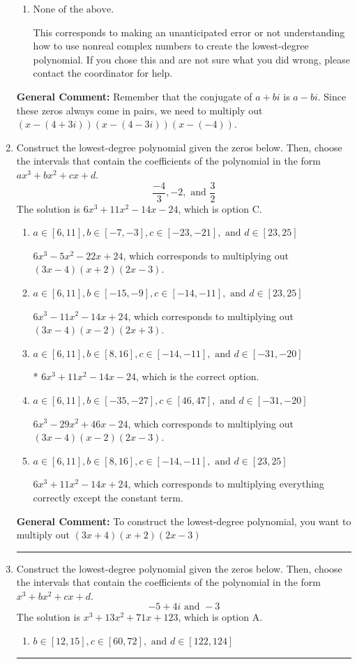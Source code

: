 \documentclass{extbook}[14pt]
\newcommand{\litem}[1]{\item #1

\rule{\textwidth}{0.4pt}}
\begin{document}
\begin{enumerate}
{\begin{enumerate}[label=\Alph*.]
* $x^{3} -4 x^{2} -7 x + 100$, which is the correct option.
\item \( \text{None of the above.} \)

This corresponds to making an unanticipated error or not understanding how to use nonreal complex numbers to create the lowest-degree polynomial. If you chose this and are not sure what you did wrong, please contact the coordinator for help.
\end{enumerate}

\textbf{General Comment:} Remember that the conjugate of $a+bi$ is $a-bi$. Since these zeros always come in pairs, we need to multiply out $(x-(4 + 3 i))(x-(4 - 3 i))(x-(-4))$.
}
\litem{
Construct the lowest-degree polynomial given the zeros below. Then, choose the intervals that contain the coefficients of the polynomial in the form $ax^3+bx^2+cx+d$.
\[ \frac{-4}{3}, -2, \text{ and } \frac{3}{2} \]The solution is \( 6x^{3} +11 x^{2} -14 x -24 \), which is option C.\begin{enumerate}[label=\Alph*.]
\item \( a \in [6, 11], b \in [-7, -3], c \in [-23, -21], \text{ and } d \in [23, 25] \)

$6x^{3} -5 x^{2} -22 x + 24$, which corresponds to multiplying out $(3x -4)(x + 2)(2x -3)$.
\item \( a \in [6, 11], b \in [-15, -9], c \in [-14, -11], \text{ and } d \in [23, 25] \)

$6x^{3} -11 x^{2} -14 x + 24$, which corresponds to multiplying out $(3x -4)(x -2)(2x + 3)$.
\item \( a \in [6, 11], b \in [8, 16], c \in [-14, -11], \text{ and } d \in [-31, -20] \)

* $6x^{3} +11 x^{2} -14 x -24$, which is the correct option.
\item \( a \in [6, 11], b \in [-35, -27], c \in [46, 47], \text{ and } d \in [-31, -20] \)

$6x^{3} -29 x^{2} +46 x -24$, which corresponds to multiplying out $(3x -4)(x -2)(2x -3)$.
\item \( a \in [6, 11], b \in [8, 16], c \in [-14, -11], \text{ and } d \in [23, 25] \)

$6x^{3} +11 x^{2} -14 x + 24$, which corresponds to multiplying everything correctly except the constant term.
\end{enumerate}

\textbf{General Comment:} To construct the lowest-degree polynomial, you want to multiply out $(3x + 4)(x + 2)(2x -3)$
}
\litem{
Construct the lowest-degree polynomial given the zeros below. Then, choose the intervals that contain the coefficients of the polynomial in the form $x^3+bx^2+cx+d$.
\[ -5 + 4 i \text{ and } -3 \]The solution is \( x^{3} +13 x^{2} +71 x + 123 \), which is option A.\begin{enumerate}[label=\Alph*.]
\item \( b \in [12, 15], c \in [60, 72], \text{ and } d \in [122, 124] \)


\end{enumerate}}
\end{enumerate}
\end{document}
